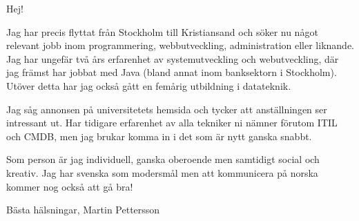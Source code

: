 \documentclass[11pt,stdletter,orderfromtodate,sigleft]{newlfm}
\begin{document}
\begin{newlfm}
Hej!

Jag har precis flyttat från Stockholm till Kristiansand och söker nu något relevant jobb inom programmering, webbutveckling, administration eller liknande. Jag har ungefär två års erfarenhet av systemutveckling och webutveckling, där jag främst har jobbat med Java (bland annat inom banksektorn i Stockholm). Utöver detta har jag också gått en femårig utbildning i datateknik. 

Jag såg annonsen på universitetets hemsida och tycker att anställningen ser intressant ut. Har tidigare erfarenhet av alla tekniker ni nämner förutom ITIL och CMDB, men jag brukar komma in i det som är nytt ganska snabbt.

Som person är jag individuell, ganska oberoende men samtidigt social och kreativ. Jag har svenska som modersmål men att kommunicera på norska kommer nog också att gå bra!

Bästa hälsningar,
Martin Pettersson
\end{newlfm}
\end{document}
